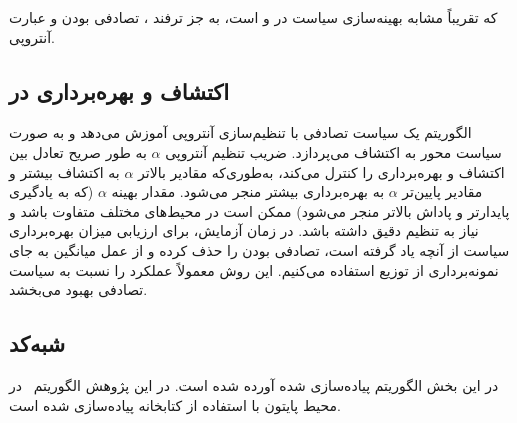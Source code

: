 که تقریباً مشابه بهینه‌سازی سیاست در  و  است، به جز ترفند ، تصادفی بودن و عبارت آنتروپی.

\subsection{اکتشاف و بهره‌برداری در }

الگوریتم  یک سیاست تصادفی با تنظیم‌سازی آنتروپی آموزش می‌دهد و به صورت سیاست محور به اکتشاف می‌پردازد. ضریب تنظیم آنتروپی \( \alpha \) به طور صریح تعادل بین اکتشاف و بهره‌برداری را کنترل می‌کند، به‌طوری‌که مقادیر بالاتر \( \alpha \) به اکتشاف بیشتر و مقادیر پایین‌تر \( \alpha \) به بهره‌برداری بیشتر منجر می‌شود. مقدار بهینه \( \alpha \) (که به یادگیری پایدارتر و پاداش بالاتر منجر می‌شود) ممکن است در محیط‌های مختلف متفاوت باشد و نیاز به تنظیم دقیق داشته باشد.
در زمان آزمایش، برای ارزیابی میزان بهره‌برداری سیاست از آنچه یاد گرفته است، تصادفی بودن را حذف کرده و از عمل میانگین به جای نمونه‌برداری از توزیع استفاده می‌کنیم. این روش معمولاً عملکرد را نسبت به سیاست تصادفی  بهبود می‌بخشد.



\subsection{شبه‌کد
	}

در این بخش الگوریتم
پیاده‌سازی شده آورده شده است. در این پژوهش الگوریتم~ در محیط پایتون با استفاده از کتابخانه
 \cite{paszke2017automatic}
پیاده‌سازی شده ‌است.




